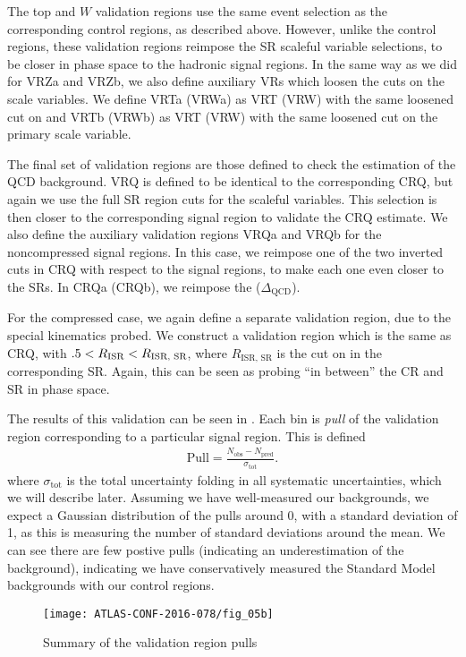 The top and $W$ validation regions use the same event selection as the corresponding control regions, as described above.
However, unlike the control regions, these validation regions reimpose the SR scaleful variable selections, to be closer in phase space to the hadronic signal regions.
In the same way as we did for VRZa and VRZb, we also define auxiliary VRs which loosen the cuts on the scale variables.
We define VRTa (VRWa) as VRT (VRW) with the same loosened cut on  and VRTb (VRWb) as VRT (VRW) with the same loosened cut on the primary scale variable.

The final set of validation regions are those defined to check the estimation of the QCD background.
VRQ is defined to be identical to the corresponding CRQ, but again we use the full SR region cuts for the scaleful variables.
This selection is then closer to the corresponding signal region to validate the CRQ estimate.
We also define the auxiliary validation regions VRQa and VRQb for the noncompressed signal regions.
In this case, we reimpose one of the two inverted cuts in CRQ with respect to the signal regions, to make each one even closer to the SRs.
In CRQa (CRQb), we reimpose the  ($\Delta_{\mathrm{QCD}}$).

For the compressed case, we again define a separate validation region, due to the special kinematics probed.
We construct a validation region which is the same as CRQ, with $.5 < R_{\text{ISR}} < R_{\text{ISR, SR}}$, where $R_{\text{ISR, SR}}$ is the cut on \risr in the corresponding SR.
Again, this can be seen as probing ``in between'' the CR and SR in phase space.

The results of this validation can be seen in .
Each bin is \textit{pull} of the validation region corresponding to a particular signal region.
This is defined
\begin{align}
\text{Pull} = \frac{N_{\mathrm{obs}} - N_{\mathrm{pred}}}{\sigma_{\mathrm{tot}}}.
\end{align}
where $\sigma_{\mathrm{tot}}$ is the total uncertainty folding in all systematic uncertainties, which we will describe later.
Assuming we have well-measured our backgrounds, we expect a Gaussian distribution of the pulls around 0, with a standard deviation of 1, as this is measuring the number of standard deviations around the mean.
We can see there are few postive pulls (indicating an underestimation of the background), indicating we have conservatively measured the Standard Model backgrounds with our control regions.
\begin{figure}[tbp]
\caption{Summary of the validation region pulls} \label{fig:vr_summary}
\texttt{[image: ATLAS-CONF-2016-078/fig\_05b]}
\end{figure}


